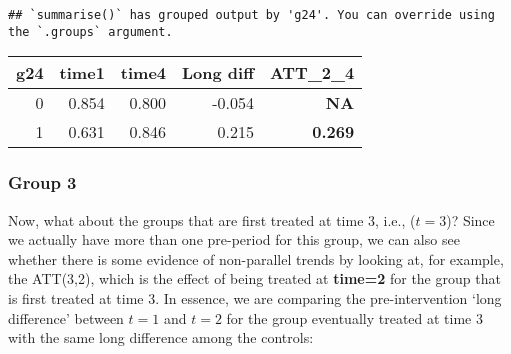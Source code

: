 \documentclass[
]{article}
\begin{document}
\begin{verbatim}
## `summarise()` has grouped output by 'g24'. You can override using the `.groups` argument.
\end{verbatim}

\begin{table}
\centering
\begin{tabular}{r|r|r|r|>{}r}
\hline
g24 & time1 & time4 & Long diff & ATT\_2\_4\\
\hline
0 & 0.854 & 0.800 & -0.054 & \textbf{NA}\\
\hline
1 & 0.631 & 0.846 & 0.215 & \textbf{0.269}\\
\hline
\end{tabular}
\end{table}

\hypertarget{group-3}{%
\subsubsection{Group 3}\label{group-3}}

Now, what about the groups that are first treated at time 3, i.e.,
(\(t=3\))? Since we actually have more than one pre-period for this
group, we can also see whether there is some evidence of non-parallel
trends by looking at, for example, the ATT(3,2), which is the effect of
being treated at \textbf{time=2} for the group that is first treated at
time 3. In essence, we are comparing the pre-intervention `long
difference' between \(t=1\) and \(t=2\) for the group eventually treated
at time 3 with the same long difference among the controls:
\end{document}
